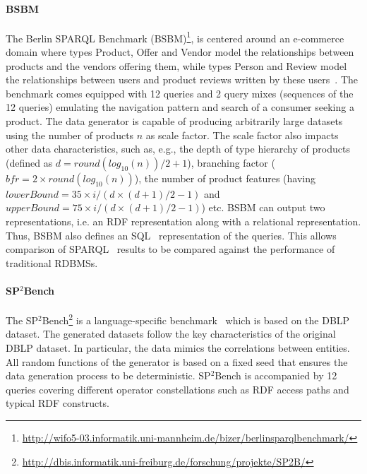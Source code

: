 \paragraph{BSBM} The Berlin SPARQL Benchmark (BSBM)\footnote{\url{http://wifo5-03.informatik.uni-mannheim.de/bizer/berlinsparqlbenchmark/}}, is centered around an e-commerce domain where types Product, Offer and Vendor model the relationships between products and the vendors offering them, while types Person and Review model the relationships between users and product reviews written by these users~\cite{Bizer09theberlin}.
The benchmark comes equipped with 12 queries and 2 query mixes (sequences of the 12 queries) emulating the navigation pattern and search of a consumer seeking a product. The data generator is capable of producing arbitrarily large datasets using the number of products $n$ as scale factor.  The scale factor also impacts other data characteristics, such as, e.g., the depth of type hierarchy of products (defined as $d = round(log_{10}(n))/2 + 1$), branching factor ($bfr = 2 \times round(log_{10}(n))$), the number of product features (having $lowerBound = 35 \times i / (d \times (d+1)/2 - 1)$ and $upperBound = 75 \times i / (d \times (d+1)/2 - 1)$) etc. BSBM can output two representations, i.e. an RDF representation along with a relational representation. Thus, BSBM also defines an SQL~\cite{sql} representation of the queries. This allows comparison of SPARQL~\cite{sparql} results  to be compared against the performance of traditional RDBMSs.


\paragraph{SP$^2$Bench} The SP$^2$Bench\footnote{\url{http://dbis.informatik.uni-freiburg.de/forschung/projekte/SP2B/}} is a language-specific benchmark~\cite{Schmidt2010} which is based on the DBLP dataset. %
The generated datasets follow the key characteristics of the original DBLP dataset. In particular, the data mimics the correlations between entities. All random functions of the generator is based on a fixed seed that ensures the data generation process to be deterministic. SP$^2$Bench is accompanied by 12 queries covering different operator constellations such as RDF access paths and typical RDF constructs.


